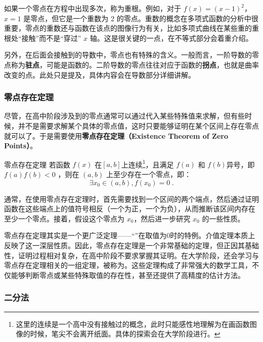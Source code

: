 如果一个零点在方程中出现多次，称为重根。例如，对于 $f(x) = (x - 1)^2$，$x = 1$ 是零点，但它是一个重数为 2 的零点。重数的概念在多项式函数的分析中很重要，零点的重数还与函数在该点的图像行为有关，比如多项式曲线在某些重的重根处“接触”而不是“穿过” $x$ 轴。这是很关键的一点，在不等式部分会着重介绍。

另外，在后面会接触到的导数中，零点也有特殊的含义。一般而言，一阶导数的零点称为\textbf{驻点}，可能是函数的。二阶导数的零点往往对应于函数的\textbf{拐点}，也就是曲率改变的点。此处只是提及，具体内容会在导数部分详细讲解。

\subsubsection{零点存在定理}

尽管，在高中阶段涉及到的零点通常可以通过代入某些特殊值来求解，但有些时候，并不是需要求解某个具体的零点值，这时只要能够证明在某个区间上存在零点就可以了。于是需要使用\textbf{零点存在定理（Existence Theorem of Zero Points）}。

\begin{theorem}{零点存在定理}
若函数 $f(x)$ 在$[a,b]$上连续\footnote{这里的连续是一个高中没有接触过的概念，此时只能感性地理解为在画函数图像的时候，笔尖不会离开纸面。具体的探索会在大学阶段进行。}，且满足 $f(a)$ 和 $f(b)$异号，即$f(a)f(b)<0$ ，则在 $(a, b)$ 上至少存在一个零点，即：
\begin{equation}
\exists x_0\in(a,b),f(x_0)=0~.
\end{equation}
\end{theorem}

通常，在使用零点存在定理时，首先需要找到一个区间的两个端点，然后通过证明函数在这些端点上的值符号相反（一个为正，一个为负），从而推断该区间内存在至少一个零点。接着，假设这个零点为 $x_0$，然后进一步研究 $x_0$ 的一些性质。

零点存在定理其实是一个更广泛定理——“”在取值为0时的特例。介值定理本质上反映了这一深层性质。因此，零点存在定理是一个非常基础的定理，但正因其基础性，证明过程相对复杂，在高中阶段不要求掌握其证明。在大学阶段，还会学习与零点存在定理相关的一组定理，被称为。这些定理构成了非常强大的数学工具，不仅能够判断零点或某些特殊取值的存在性，甚至还提供了高精度的估计方法。

\subsubsection{二分法}

